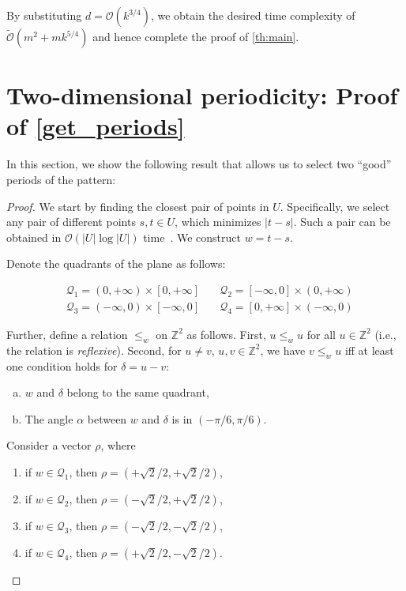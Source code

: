\documentclass[11pt, letterpaper]{article}
\theoremstyle{plain}
\theoremstyle{definition}
\theoremstyle{remark}
\newcommand{\Z}{\mathbb{Z}}
\renewcommand{\O}{\mathcal{O}}
\newcommand{\tO}{\tilde{\mathcal{O}}}
\newcommand{\Q}{\mathcal{Q}}
\begin{document}
By substituting $d = \O(k^{3/4})$, we obtain the desired time complexity of $\tO(m^2 + mk^{5/4})$ and hence complete the proof of \cref{th:main}.

\section{Two-dimensional periodicity: Proof of \cref{get_periods}}
In this section, we show the following result that allows us to select two ``good'' periods of the pattern:

\GetPeriods
\begin{proof}
We start by finding the closest pair of points in $U$.
Specifically, we select any pair of different points $s, t \in U$, which minimizes $|t - s|$. 
Such a pair can be obtained in $\O(|U| \log |U|)$ time~\cite{Clarkson1983}.
We construct $w = t - s$.

Denote the quadrants of the plane as follows:

\begin{align*}
&\Q_1 = (0,+\infty) \times [0,+\infty] \quad & \Q_2 = [-\infty,0] \times (0,+\infty)\\
&\Q_3 = (-\infty,0) \times [-\infty,0] \quad & \Q_4 = [0,+\infty] \times (-\infty,0)
\end{align*}

Further, define a relation $\le_{w}$ on $\Z^2$ as follows. First, $u \le_w u$ for all $u \in \Z^2$ (i.e., the relation is \emph{reflexive}). Second, for $u \neq v$, $u, v \in \Z^2$, we have $v \le_w u$ iff at least one condition holds for $\delta = u - v$:
\begin{enumerate}[(a)]
	\item $w$ and $\delta$ belong to the same quadrant, \label{quadrant_condition}
	\item The angle $\alpha$ between $w$ and $\delta$ is in $(-\pi / 6, \pi / 6)$. \label{angle_condition}
\end{enumerate}

Consider a vector $\rho$, where

\begin{enumerate}
	\item if $w \in \Q_1$, then $\rho = (+\sqrt{2} / 2, +\sqrt{2} / 2)$,
	\item if $w \in \Q_2$, then $\rho = (-\sqrt{2} / 2, +\sqrt{2} / 2)$,
	\item if $w \in \Q_3$, then $\rho = (-\sqrt{2} / 2, -\sqrt{2} / 2)$,
	\item if $w \in \Q_4$, then $\rho = (+\sqrt{2} / 2, -\sqrt{2} / 2)$.
\end{enumerate}


\end{proof}
\end{document}
